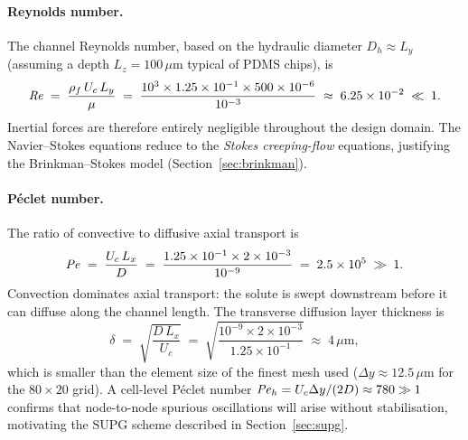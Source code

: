 \paragraph{Reynolds number.}
The channel Reynolds number, based on the hydraulic diameter
$D_{h} \approx L_{y}$ (assuming a depth $L_{z} = 100\,\mu\text{m}$
typical of PDMS chips), is
%
\begin{equation}
  \mathit{Re}
  \;=\; \frac{\rho_{f}\,U_{c}\,L_{y}}{\mu}
  \;=\; \frac{10^{3}\times1.25\times10^{-1}\times500\times10^{-6}}
             {10^{-3}}
  \;\approx\; 6.25\times10^{-2} \;\ll\; 1.
  \label{eq:Re}
\end{equation}
%
Inertial forces are therefore entirely negligible throughout the design
domain. The Navier--Stokes equations reduce to the \emph{Stokes creeping-flow}
equations, justifying the Brinkman--Stokes model
(Section~\ref{sec:brinkman}).

\paragraph{P\'eclet number.}
The ratio of convective to diffusive axial transport is
%
\begin{equation}
  \mathit{Pe}
  \;=\; \frac{U_{c}\,L_{x}}{D}
  \;=\; \frac{1.25\times10^{-1}\times2\times10^{-3}}
             {10^{-9}}
  \;=\; 2.5\times10^{5} \;\gg\; 1.
  \label{eq:Pe}
\end{equation}
%
Convection dominates axial transport: the solute is swept downstream before
it can diffuse along the channel length.
The transverse diffusion layer thickness is
%
\begin{equation}
  \delta
  \;=\; \sqrt{\frac{D\,L_{x}}{U_{c}}}
  \;=\; \sqrt{\frac{10^{-9}\times2\times10^{-3}}{1.25\times10^{-1}}}
  \;\approx\; 4\,\mu\text{m},
  \label{eq:delta}
\end{equation}
%
which is smaller than the element size of the finest mesh used
($\Delta y \approx 12.5\,\mu\text{m}$ for the $80\times20$ grid).
A cell-level P\'eclet number
$\mathit{Pe}_{h} = U_{c}\Delta y / (2D) \approx 780 \gg 1$ confirms that
node-to-node spurious oscillations will arise without stabilisation,
motivating the SUPG scheme described in Section~\ref{sec:supg}.


